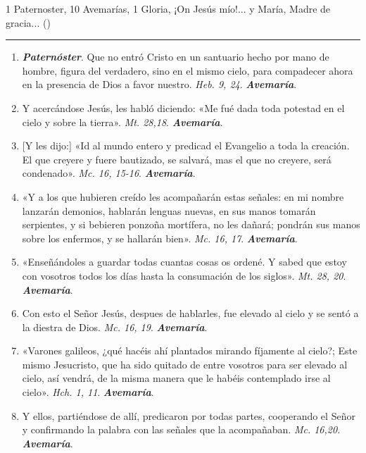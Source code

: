 \documentclass[11pt,a4paper]{book}
\begin{document}
    1 Paternoster, 10 Avemarías, 1 Gloria, ¡On Jesús mío!... y María, Madre de gracia... ()

    \rule{\textwidth}{0.5pt}

    \begin{enumerate}
        \item \textbf{\emph{Paternóster}}. Que no entró Cristo en un santuario hecho por mano de hombre, figura del verdadero, sino en el mismo cielo, para compadecer ahora en
            la presencia de Dios a favor nuestro. \emph{Heb. 9, 24}. \textbf{\emph{Avemaría}}.

        \item Y acercándose Jesús, les habló diciendo: «Me fué dada toda potestad en el cielo y sobre la tierra». \emph{Mt. 28,18}. \textbf{\emph{Avemaría}}.

        \item {[Y les dijo:]} «Id al mundo entero y predicad el Evangelio a toda la creación. El que creyere y fuere bautizado, 
            se salvará, mas el que no creyere, será condenado». \emph{Mc. 16, 15-16}. \textbf{\emph{Avemaría}}.

        \item «Y a los que hubieren creído les acompañarán estas señales: en mi nombre lanzarán demonios, hablarán lenguas nuevas, en sus manos tomarán serpientes, 
            y si bebieren ponzoña mortífera, no les dañará; pondrán sus manos sobre los enfermos, y se hallarán bien». \emph{Mc. 16, 17}. \textbf{\emph{Avemaría}}.

        \item «Enseñándoles a guardar todas cuantas cosas os ordené. Y sabed que estoy con vosotros todos los días hasta la consumación de los siglos». 
            \emph{Mt. 28, 20}. \textbf{\emph{Avemaría}}.

        \item Con esto el Señor Jesús, despues de hablarles, fue elevado al cielo y se sentó a la diestra de Dios. \emph{Mc. 16, 19}. \textbf{\emph{Avemaría}}.

        \item «Varones galileos, ¿qué hacéis ahí plantados mirando fíjamente al cielo?; Este mismo Jesucristo, que ha sido quitado de entre vosotros 
            para ser elevado al cielo, así vendrá, de la misma manera que le habéis contemplado irse al cielo». \emph{Hch. 1, 11}. \textbf{\emph{Avemaría}}.

        \item Y ellos, partiéndose de allí, predicaron por todas partes, cooperando el Señor y confirmando la palabra con las señales que la acompañaban. 
            \emph{Mc. 16,20}. \textbf{\emph{Avemaría}}.


\end{enumerate}
\end{document}
